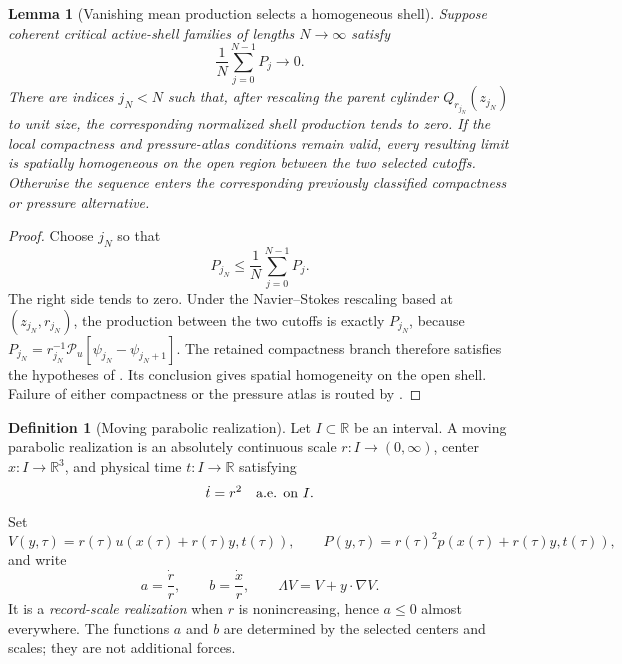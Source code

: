 \documentclass[11pt]{amsart}
\numberwithin{equation}{section}
\theoremstyle{plain}
\newtheorem{lemma}[lemma]{Lemma}
\theoremstyle{definition}
\newtheorem{definition}[definition]{Definition}
\theoremstyle{remark}
\begin{document}
\begin{lemma}[Vanishing mean production selects a homogeneous shell]
\label{lem:vanishing-mean-production-shell}
Suppose coherent critical active-shell families of lengths \(N\to\infty\)
satisfy
\[
 \frac1N\sum_{j=0}^{N-1}P_j\longrightarrow0.
\]
There are indices
\(j_N<N\) such that, after rescaling the parent cylinder
\(Q_{r_{j_N}}(z_{j_N})\) to unit size, the corresponding normalized shell
production tends to zero.  If the local compactness and pressure-atlas
conditions remain valid, every resulting limit is spatially homogeneous on
the open region between the two selected cutoffs.  Otherwise the sequence
enters the corresponding previously classified compactness or pressure
alternative.
\end{lemma}

\begin{proof}
Choose \(j_N\) so that
\[
 P_{j_N}\le \frac1N\sum_{j=0}^{N-1}P_j.
\]
The right side tends to zero.  Under the Navier--Stokes rescaling based at
\((z_{j_N},r_{j_N})\), the production between the two cutoffs is exactly
\(P_{j_N}\), because
\(P_{j_N}=r_{j_N}^{-1}
\mathscr P_u[\psi_{j_N}-\psi_{j_N+1}]\).
The retained compactness branch therefore satisfies the hypotheses of
.  Its conclusion gives spatial
homogeneity on the open shell.  Failure of either compactness or the pressure
atlas is routed by
.
\end{proof}

\begin{definition}[Moving parabolic realization]
\label{def:moving-parabolic-realization}
Let \(I\subset\mathbb R\) be an interval.  A moving parabolic realization is
an absolutely continuous scale \(r:I\to(0,\infty)\), center
\(x:I\to\mathbb R^3\), and physical time \(t:I\to\mathbb R\) satisfying
\[
 \dot t=r^2\quad\hbox{a.e. on }I.
\]
Set
\begin{equation}\label{eq:moving-parabolic-chart}
 V(y,\tau)=r(\tau)u(x(\tau)+r(\tau)y,t(\tau)),
 \qquad
 P(y,\tau)=r(\tau)^2p(x(\tau)+r(\tau)y,t(\tau)),
\end{equation}
and write
\[
 a=\frac{\dot r}{r},\qquad b=\frac{\dot x}{r},
 \qquad \Lambda V=V+y\cdot\nabla V.
\]
It is a \emph{record-scale realization} when \(r\) is nonincreasing, hence
\(a\le0\) almost everywhere.  The functions \(a\) and \(b\) are determined
by the selected centers and scales; they are not additional forces.
\end{definition}
\end{document}
